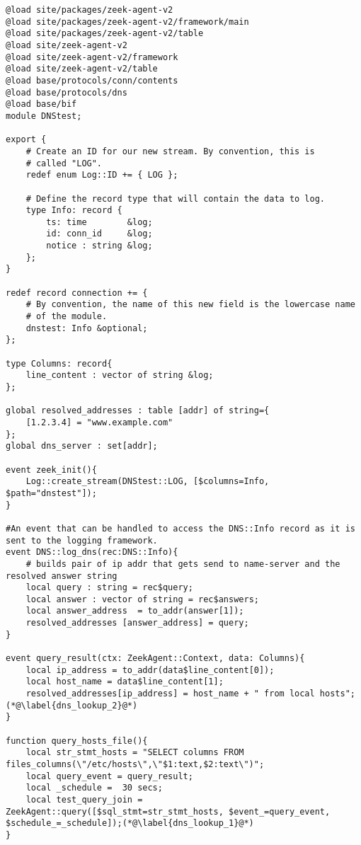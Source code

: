 \begin{lstlisting}[firstnumber=53,label={Code_5},linerange={53-64,65-73},caption={Überprüfung der Verbindungsziele eines Endgerätes},numberblanklines=false]
@load site/packages/zeek-agent-v2
@load site/packages/zeek-agent-v2/framework/main
@load site/packages/zeek-agent-v2/table
@load site/zeek-agent-v2
@load site/zeek-agent-v2/framework
@load site/zeek-agent-v2/table
@load base/protocols/conn/contents
@load base/protocols/dns
@load base/bif
module DNStest;

export {
    # Create an ID for our new stream. By convention, this is
    # called "LOG".
    redef enum Log::ID += { LOG };

    # Define the record type that will contain the data to log.
    type Info: record {
        ts: time        &log;
        id: conn_id     &log; 
        notice : string &log;
    };
}   

redef record connection += {
    # By convention, the name of this new field is the lowercase name
    # of the module.
    dnstest: Info &optional;
};

type Columns: record{
    line_content : vector of string &log;
};

global resolved_addresses : table [addr] of string={
    [1.2.3.4] = "www.example.com"
};
global dns_server : set[addr];

event zeek_init(){
    Log::create_stream(DNStest::LOG, [$columns=Info, $path="dnstest"]);
}

#An event that can be handled to access the DNS::Info record as it is sent to the logging framework.
event DNS::log_dns(rec:DNS::Info){
    # builds pair of ip addr that gets send to name-server and the resolved answer string
    local query : string = rec$query;
    local answer : vector of string = rec$answers;
    local answer_address  = to_addr(answer[1]);
    resolved_addresses [answer_address] = query;
}

event query_result(ctx: ZeekAgent::Context, data: Columns){
    local ip_address = to_addr(data$line_content[0]);
    local host_name = data$line_content[1];
    resolved_addresses[ip_address] = host_name + " from local hosts";(*@\label{dns_lookup_2}@*)
}

function query_hosts_file(){
    local str_stmt_hosts = "SELECT columns FROM files_columns(\"/etc/hosts\",\"$1:text,$2:text\")";
    local query_event = query_result;
    local _schedule =  30 secs;
    local test_query_join = ZeekAgent::query([$sql_stmt=str_stmt_hosts, $event_=query_event, $schedule_=_schedule]);(*@\label{dns_lookup_1}@*)   
}


\end{lstlisting}
